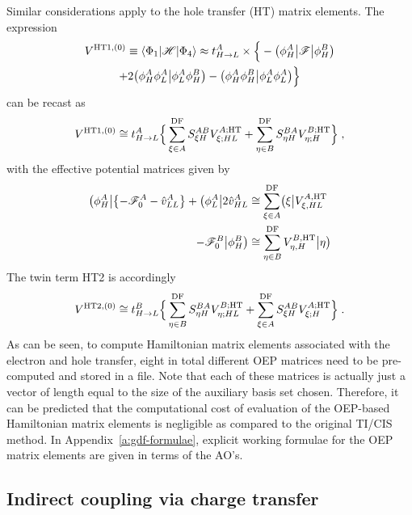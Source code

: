 Similar considerations apply to the hole transfer (HT) matrix elements.
The expression
%
\begin{multline}\label{e:v0-ht1}
 V^{{\rm HT1},(0)} \equiv \left< \Phi_1 \vert \mathscr{H} \vert \Phi_4 \right> \approx 
 t_{H\rightarrow L}^A \times \Big\{ 
-\big(\phi_H^A \big| \mathscr{F} \big| \phi_H^B \big) \\
   + 2 \big( \phi_H^A \phi_L^A \big| \phi_L^A \phi_H^B \big) - \big( \phi_H^A \phi_H^B \big| \phi_L^A \phi_L^A \big) 
 \Big\} 
\end{multline}
%
can be recast as
%
\begin{multline}\label{e:v0-ht1-oep}
 V^{{\rm HT1},(0)} \cong t_{H\rightarrow L}^A \Big\{ 
 \sum_{\xi\in A}^{\rm DF} S_{\xi H}^{AB} V^{A;{\rm HT}}_{\xi;HL} +
 \sum_{\eta\in B}^{\rm DF} S_{\eta H}^{BA} V^{B;{\rm HT}}_{\eta;H}
 \Big\} \;,
\end{multline}
%
with the effective potential matrices given by
%
%
\begin{subequations}
\begin{align}
 \bigl( {\phi_H^A} \bigl\lvert \left\{ -\mathscr{F}_0^A - \hat{v}^A_{LL} \right\}
 + \bigl( {\phi_L^A} \bigl\lvert 2 \hat{v}^A_{HL} 
 &\cong \sum_{\xi\in A}^{\rm DF} \bigl( {\xi} \bigl\lvert V^{A,{\rm HT}}_{\xi,HL} \\
 -\mathscr{F}_0^B \bigr\rvert {\phi_H^B} \bigr) &\cong \sum_{\eta\in B}^{\rm DF} V^{B,{\rm HT}}_{\eta,H} \bigr\rvert {\eta} \bigr) 
\end{align}
\end{subequations}
%
The twin term HT2 is accordingly
%
\begin{multline}\label{e:v0-ht2-oep}
 V^{{\rm HT2},(0)} \cong t_{H\rightarrow L}^B \Big\{ 
 \sum_{\eta\in B}^{\rm DF} S_{\eta H}^{BA} V^{B;{\rm HT}}_{\eta;HL} +
 \sum_{\xi\in A}^{\rm DF} S_{\xi H}^{AB} V^{A;{\rm HT}}_{\xi;H}
 \Big\} \;.
\end{multline}
%
As can be seen, to compute Hamiltonian matrix elements
associated with the electron and hole transfer, eight in total
different OEP matrices need to be pre\hyp{}computed and stored in a file.
Note that each of these matrices is actually just a vector of length
equal to the size of the auxiliary basis set chosen. Therefore,
it can be predicted that the computational cost of evaluation of the OEP\hyp{}based Hamiltonian
matrix elements is negligible as compared to the original TI/CIS method.
In Appendix~\ref{a:gdf-formulae}, explicit working formulae
for the OEP matrix elements are given in terms of the AO's.

\subsection{\label{s:2.2}Indirect coupling via charge transfer}

